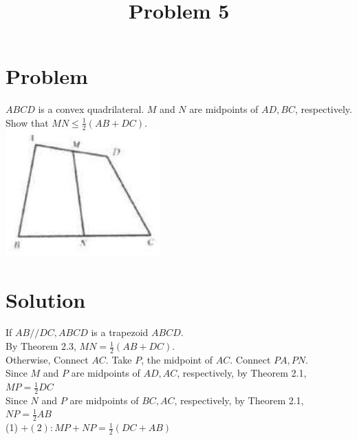 \documentclass{article}
\title{Problem 5}
\date{}
\begin{document}
\maketitle

\section*{Problem}
\(A B C D\) is a convex quadrilateral. \(M\) and \(N\) are midpoints of \(A D, B C\), respectively. Show that \(M N \leq \frac{1}{2}(A B+D C)\).\\
\centering
\includegraphics[width=\textwidth]{images/problem_image_1.jpg}

\section*{Solution}
If \(A B / / D C, A B C D\) is a trapezoid \(A B C D\).\\
By Theorem 2.3, \(M N=\frac{1}{2}(A B+D C)\).\\
Otherwise, Connect \(A C\). Take \(P\), the midpoint of \(A C\). Connect \(P A, P N\).\\
Since \(M\) and \(P\) are midpoints of \(A D, A C\), respectively, by Theorem 2.1,\\
\(M P=\frac{1}{2} D C\)\\
Since \(N\) and \(P\) are midpoints of \(B C, A C\), respectively, by Theorem 2.1,\\
\(N P=\frac{1}{2} A B\)\\
(1) \(+(2): M P+N P=\frac{1}{2}(D C+A B)\)
\end{document}
